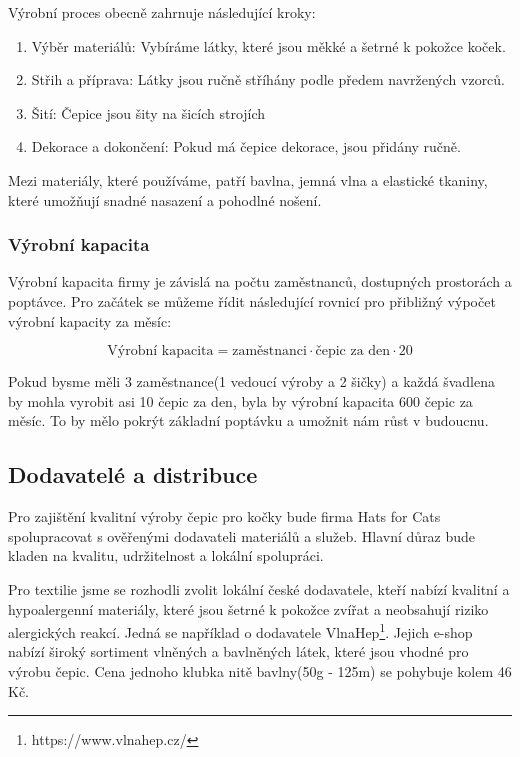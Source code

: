 \documentclass[12pt, a4paper]{article}
\begin{document}
Výrobní proces obecně zahrnuje následující kroky:

\begin{enumerate}
  \item Výběr materiálů: Vybíráme látky, které jsou měkké a šetrné k pokožce koček.
  \item Střih a příprava: Látky jsou ručně stříhány podle předem navržených vzorců.
  \item Šití: Čepice jsou šity na šicích strojích
  \item Dekorace a dokončení: Pokud má čepice dekorace, jsou přidány ručně.
\end{enumerate}

Mezi materiály, které používáme, patří bavlna, jemná vlna a elastické tkaniny, které umožňují snadné nasazení a pohodlné nošení.

\subsubsection{Výrobní kapacita}

Výrobní kapacita firmy je závislá na počtu zaměstnanců, dostupných prostorách a poptávce.
Pro začátek se můžeme řídit následující rovnicí pro přibližný výpočet výrobní kapacity za měsíc:

\begin{equation}
  \text{Výrobní kapacita} = \text{zaměstnanci} \cdot \text{čepic za den} \cdot 20
\end{equation}

Pokud bysme měli 3 zaměstnance(1 vedoucí výroby a 2 šičky) a každá švadlena by mohla vyrobit asi 10 čepic za den, byla by výrobní kapacita 600 čepic za měsíc.
To by mělo pokrýt základní poptávku a umožnit nám růst v budoucnu.

\subsection{Dodavatelé a distribuce}

Pro zajištění kvalitní výroby čepic pro kočky bude firma Hats for Cats spolupracovat s ověřenými dodavateli materiálů a služeb.
Hlavní důraz bude kladen na kvalitu, udržitelnost a lokální spolupráci.

Pro textilie jsme se rozhodli zvolit lokální české dodavatele, kteří nabízí
kvalitní a hypoalergenní materiály, které jsou šetrné k pokožce zvířat a
neobsahují riziko alergických reakcí. Jedná se například o dodavatele VlnaHep\footnote{https://www.vlnahep.cz/}.
Jejich e-shop nabízí široký sortiment vlněných a bavlněných látek, které jsou vhodné pro výrobu čepic.
Cena jednoho klubka nitě bavlny(50g - 125m) se pohybuje kolem 46 Kč.
\end{document}

